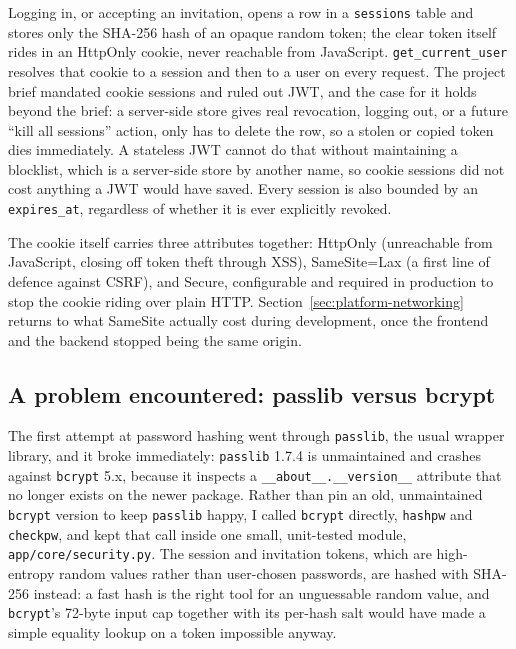 Logging in, or accepting an invitation, opens a row in a \texttt{sessions} table and stores only the SHA-256 hash of an opaque random token; the clear token itself rides in an HttpOnly cookie, never reachable from JavaScript. \texttt{get\_\allowbreak current\_\allowbreak user} resolves that cookie to a session and then to a user on every request. The project brief mandated cookie sessions and ruled out JWT, and the case for it holds beyond the brief: a server-side store gives real revocation, logging out, or a future ``kill all sessions'' action, only has to delete the row, so a stolen or copied token dies immediately. A stateless JWT cannot do that without maintaining a blocklist, which is a server-side store by another name, so cookie sessions did not cost anything a JWT would have saved. Every session is also bounded by an \texttt{expires\_\allowbreak at}, regardless of whether it is ever explicitly revoked.

The cookie itself carries three attributes together: HttpOnly (unreachable from JavaScript, closing off token theft through XSS), SameSite=Lax (a first line of defence against CSRF), and Secure, configurable and required in production to stop the cookie riding over plain HTTP. Section~\ref{sec:platform-networking} returns to what SameSite actually cost during development, once the frontend and the backend stopped being the same origin.

\subsection{A problem encountered: passlib versus bcrypt}

The first attempt at password hashing went through \texttt{passlib}, the usual wrapper library, and it broke immediately: \texttt{passlib} 1.7.4 is unmaintained and crashes against \texttt{bcrypt} 5.x, because it inspects a \texttt{\_\allowbreak \_\allowbreak about\_\allowbreak \_\allowbreak .\allowbreak \_\allowbreak \_\allowbreak version\_\allowbreak \_\allowbreak } attribute that no longer exists on the newer package. Rather than pin an old, unmaintained \texttt{bcrypt} version to keep \texttt{passlib} happy, I called \texttt{bcrypt} directly, \texttt{hashpw} and \texttt{checkpw}, and kept that call inside one small, unit-tested module, \texttt{app/\allowbreak core/\allowbreak security.\allowbreak py}. The session and invitation tokens, which are high-entropy random values rather than user-chosen passwords, are hashed with SHA-256 instead: a fast hash is the right tool for an unguessable random value, and \texttt{bcrypt}'s 72-byte input cap together with its per-hash salt would have made a simple equality lookup on a token impossible anyway.

